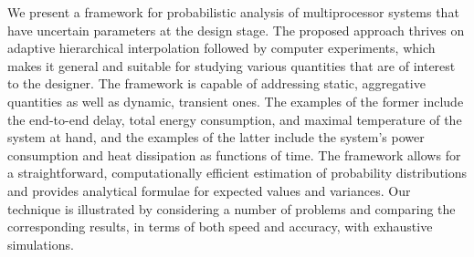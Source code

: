 We present a framework for probabilistic analysis of multiprocessor systems that
have uncertain parameters at the design stage. The proposed approach thrives on
adaptive hierarchical interpolation followed by computer experiments, which
makes it general and suitable for studying various quantities that are of
interest to the designer. The framework is capable of addressing static,
aggregative quantities as well as dynamic, transient ones. The examples of the
former include the end-to-end delay, total energy consumption, and maximal
temperature of the system at hand, and the examples of the latter include the
system's power consumption and heat dissipation as functions of time. The
framework allows for a straightforward, computationally efficient estimation of
probability distributions and provides analytical formulae for expected values
and variances. Our technique is illustrated by considering a number of problems
and comparing the corresponding results, in terms of both speed and accuracy,
with exhaustive simulations.

